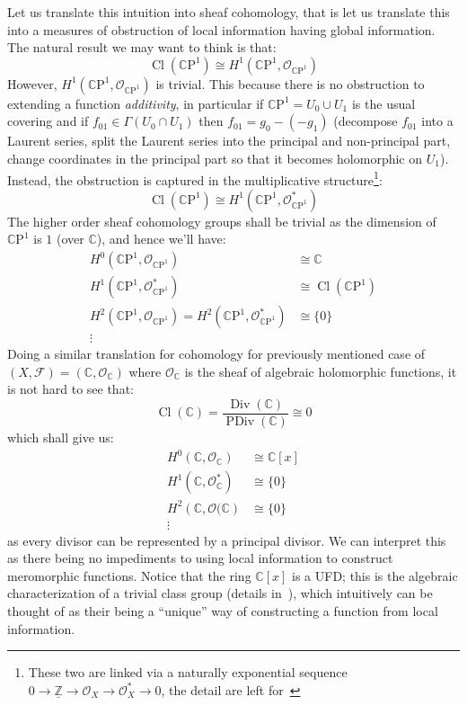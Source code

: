 \documentclass{book}
\newcommand{\Z}{{\mathbb{Z}}}
\newcommand{\C}{{\mathbb{C}}}
\newcommand{\CF}{{\mathcal{F}}}
\newcommand{\CO}{{\mathcal{O}}}
\newcommand{\CP}{{\mathbb{C}\mathrm{P}}}
\newcommand{\Div}{{\operatorname{Div}}}
\newcommand{\PDiv}{{\operatorname{PDiv}}}
\newcommand{\Cl}{{\operatorname{Cl}}}
\begin{document}
Let us translate this intuition into sheaf cohomology, that is let us translate this into a  measures of
obstruction of local information having global information. The natural result we may want to think is that:
\[
  \Cl(\CP^1) \cong H^1(\CP^1, \CO_{\CP^1})
\]
However, $H^1(\CP^1, \CO_{\CP^1})$ is trivial. This because there is no obstruction to extending a function
\emph{additivity}, in particular if $\CP^1 = U_0 \cup U_1$ is the usual covering and if $f_{01} \in
\Gamma(U_0\cap U_1)$ then $f_{01} = g_0 - (-g_1)$ (decompose $f_{01}$ into a Laurent series, split the Laurent
series into the principal and non-principal part, change coordinates in the principal part so that it becomes
holomorphic on $U_1$). Instead, the obstruction is captured in the multiplicative structure\footnote{These
  two are linked via a naturally exponential sequence $0 \to \underline{\Z} \to \CO_X \to \CO_X^* \to 0$, the detail are
left for~\cite{NateAlgGeo}}:
\[
  \Cl(\CP^1) \cong H^1(\CP^1, \CO_{\CP^1}^*)
\]
The
higher order sheaf cohomology groups shall be trivial as the dimension of $\CP^1$ is $1$ (over $\C$), and
hence we'll have:
\begin{align*}
  H^0(\CP^1, \CO_{\CP^1}) &\cong \C\\
  H^1(\CP^1, \CO_{\CP^1}^*) &\cong \Cl(\CP^1)\\
  H^2(\CP^1, \CO_{\CP^1}) = H^2(\CP^1, \CO_{\CP^1}^*)&\cong \{0\}\\
  \vdots
\end{align*}
Doing a similar translation for cohomology for previously mentioned case of $(X, \CF) = (\C, \CO_\C)$ where
$\CO_\C$ is the sheaf of algebraic holomorphic functions, it is not hard to see that:
\[
  \Cl(\C) = \frac{\Div(\C)}{\PDiv(\C)} \cong 0
\]
which shall give us:
\begin{align*}
  H^0(\C, \CO_{\C}) &\cong \C[x]\\
  H^1(\C, \CO_{\C}^*) &\cong \{0\}\\
  H^2(\C, \CO{(\C}) &\cong \{0\}\\
  \vdots
\end{align*}
as every divisor can be represented by a principal divisor. We can interpret this as there being no
impediments to using local information to construct meromorphic functions. Notice that the ring $\C[x]$ is
a UFD; this is the algebraic characterization of a trivial class group (details in~\cite{NateAlgGeo}), which
intuitively can be thought of as their being a ``unique'' way of constructing a function from local
information.
\end{document}
